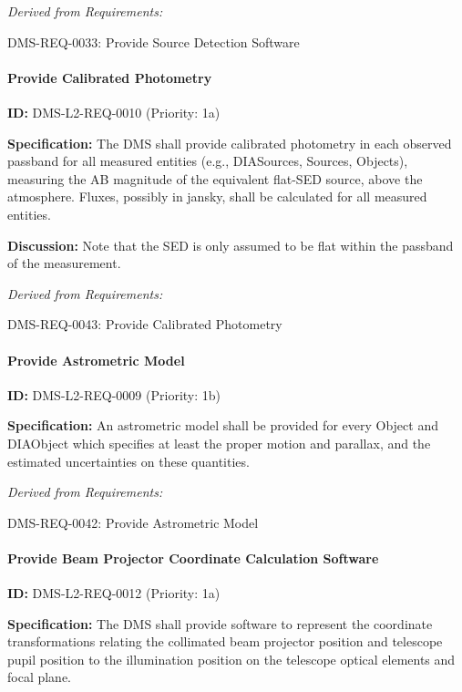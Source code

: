 \documentclass[SE,toc,lsstdraft]{lsstdoc}
\begin{document}
\emph{Derived from Requirements:}

DMS-REQ-0033:
Provide Source Detection Software \newline

\paragraph{Provide Calibrated Photometry}\hfill  %

\label{DMS-L2-REQ-0010}
\textbf{ID:} DMS-L2-REQ-0010 (Priority: 1a)

\textbf{Specification:} The DMS shall provide calibrated photometry in each observed passband for all measured entities (e.g., DIASources, Sources, Objects), measuring the AB magnitude of the equivalent flat-SED source, above the atmosphere. Fluxes, possibly in jansky, shall be calculated for all measured entities.

\textbf{Discussion: }Note that the SED is only assumed to be flat within the passband of the measurement.

\emph{Derived from Requirements:}

DMS-REQ-0043:
Provide Calibrated Photometry \newline

\paragraph{Provide Astrometric Model}\hfill  %

\label{DMS-L2-REQ-0009}
\textbf{ID:} DMS-L2-REQ-0009 (Priority: 1b)

\textbf{Specification:} An astrometric model shall be provided for every Object and DIAObject which specifies at least the proper motion and parallax, and the estimated uncertainties on these quantities.

\emph{Derived from Requirements:}

DMS-REQ-0042:
Provide Astrometric Model \newline

\paragraph{Provide Beam Projector Coordinate Calculation Software}\hfill  %

\label{DMS-L2-REQ-0012}
\textbf{ID:} DMS-L2-REQ-0012 (Priority: 1a)

\textbf{Specification:}  The DMS shall provide software to represent the coordinate transformations relating the collimated beam projector position and telescope pupil position to the illumination position on the telescope optical elements and focal plane.
\end{document}
